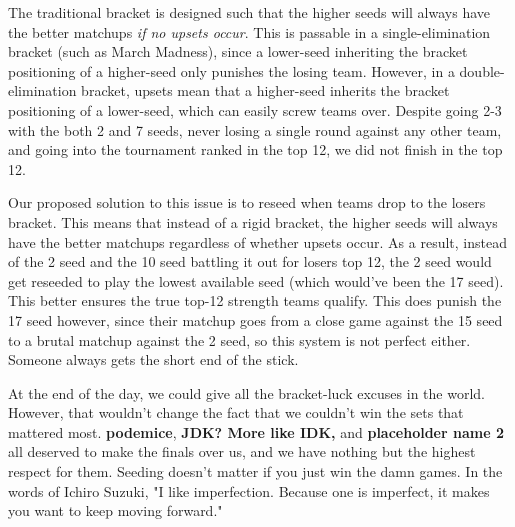 \medskip

The traditional bracket is designed such that the higher seeds will always have the better matchups \textit{if no upsets occur}. This is passable in a single-elimination bracket (such as March Madness), since a lower-seed inheriting the bracket positioning of a higher-seed only punishes the losing team. However, in a double-elimination bracket, upsets mean that a higher-seed inherits the bracket positioning of a lower-seed, which can easily screw teams over. Despite going 2-3 with the both 2 and 7 seeds, never losing a single round against any other team, and going into the tournament ranked in the top 12, we did not finish in the top 12.

\medskip

Our proposed solution to this issue is to reseed when teams drop to the losers bracket. This means that instead of a rigid bracket, the higher seeds will always have the better matchups regardless of whether upsets occur. As a result, instead of the 2 seed and the 10 seed battling it out for losers top 12, the 2 seed would get reseeded to play the lowest available seed (which would've been the 17 seed). This better ensures the true top-12 strength teams qualify. This does punish the 17 seed however, since their matchup goes from a close game against the 15 seed to a brutal matchup against the 2 seed, so this system is not perfect either. Someone always gets the short end of the stick.

\medskip

At the end of the day, we could give all the bracket-luck excuses in the world. However, that wouldn't change the fact that we couldn't win the sets that mattered most. \textbf{podemice}, \textbf{JDK? More like IDK,} and \textbf{placeholder name 2} all deserved to make the finals over us, and we have nothing but the highest respect for them. Seeding doesn't matter if you just win the damn games. In the words of Ichiro Suzuki, "I like imperfection. Because one is imperfect, it makes you want to keep moving forward."